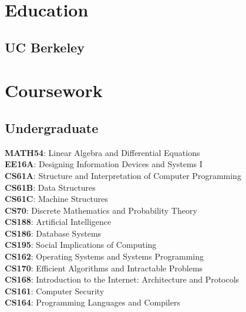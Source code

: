 \documentclass[]{deedy-resume}
\begin{document}
%
%



%
%

\begin{minipage}[t]{0.33\textwidth}


\section{Education}

\subsection{UC Berkeley}
\sectionsep{}


\section{Coursework}
\subsection{Undergraduate}
\textbf{MATH54}: Linear Algebra and Differential Equations\\
\textbf{EE16A}: Designing Information Devices and Systems I\\
\textbf{CS61A}: Structure and Interpretation of Computer Programming\\
\textbf{CS61B}: Data Structures\\
\textbf{CS61C}: Machine Structures\\
\textbf{CS70}: Discrete Mathematics and Probability Theory\\
\textbf{CS188}: Artificial Intelligence\\
\textbf{CS186}: Database Systems\\
\textbf{CS195}: Social Implications of Computing\\
\textbf{CS162}: Operating Systems and Systems Programming\\
\textbf{CS170}: Efficient Algorithms and Intractable Problems\\
\textbf{CS168}: Introduction to the Internet: Architecture and Protocols\\
\textbf{CS161}: Computer Security\\
\textbf{CS164}: Programming Languages and Compilers


\end{minipage}
\end{document}
